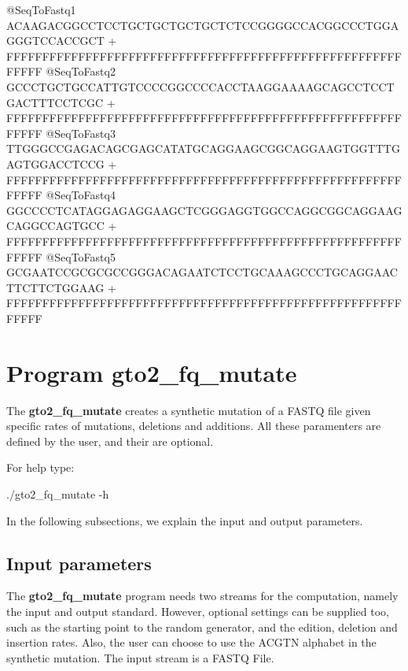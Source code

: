 \documentclass[11pt,]{krantz}
\newenvironment{Shaded}{\begin{snugshade}}{\end{snugshade}}
\newcommand{\ExtensionTok}[1]{#1}
\newcommand{\NormalTok}[1]{#1}
\begin{document}
\begin{Shaded}
\begin{Highlighting}[]
\ExtensionTok{@SeqToFastq1}
\ExtensionTok{ACAAGACGGCCTCCTGCTGCTGCTGCTCTCCGGGGCCACGGCCCTGGAGGGTCCACCGCT}
\ExtensionTok{+}
\ExtensionTok{FFFFFFFFFFFFFFFFFFFFFFFFFFFFFFFFFFFFFFFFFFFFFFFFFFFFFFFFFFFF}
\ExtensionTok{@SeqToFastq2}
\ExtensionTok{GCCCTGCTGCCATTGTCCCCGGCCCCACCTAAGGAAAAGCAGCCTCCTGACTTTCCTCGC}
\ExtensionTok{+}
\ExtensionTok{FFFFFFFFFFFFFFFFFFFFFFFFFFFFFFFFFFFFFFFFFFFFFFFFFFFFFFFFFFFF}
\ExtensionTok{@SeqToFastq3}
\ExtensionTok{TTGGGCCGAGACAGCGAGCATATGCAGGAAGCGGCAGGAAGTGGTTTGAGTGGACCTCCG}
\ExtensionTok{+}
\ExtensionTok{FFFFFFFFFFFFFFFFFFFFFFFFFFFFFFFFFFFFFFFFFFFFFFFFFFFFFFFFFFFF}
\ExtensionTok{@SeqToFastq4}
\ExtensionTok{GGCCCCTCATAGGAGAGGAAGCTCGGGAGGTGGCCAGGCGGCAGGAAGCAGGCCAGTGCC}
\ExtensionTok{+}
\ExtensionTok{FFFFFFFFFFFFFFFFFFFFFFFFFFFFFFFFFFFFFFFFFFFFFFFFFFFFFFFFFFFF}
\ExtensionTok{@SeqToFastq5}
\ExtensionTok{GCGAATCCGCGCGCCGGGACAGAATCTCCTGCAAAGCCCTGCAGGAACTTCTTCTGGAAG}
\ExtensionTok{+}
\ExtensionTok{FFFFFFFFFFFFFFFFFFFFFFFFFFFFFFFFFFFFFFFFFFFFFFFFFFFFFFFFFFFF}
\end{Highlighting}
\end{Shaded}

\section{Program gto2\_fq\_mutate}\label{program-gto2_fq_mutate}

The \textbf{gto2\_fq\_mutate} creates a synthetic mutation of a FASTQ
file given specific rates of mutations, deletions and additions. All
these paramenters are defined by the user, and their are optional.

For help type:

\begin{Shaded}
\begin{Highlighting}[]
\ExtensionTok{./gto2_fq_mutate}\NormalTok{ -h}
\end{Highlighting}
\end{Shaded}

In the following subsections, we explain the input and output
parameters.

\subsection*{Input parameters}\label{input-parameters-10}


The \textbf{gto2\_fq\_mutate} program needs two streams for the
computation, namely the input and output standard. However, optional
settings can be supplied too, such as the starting point to the random
generator, and the edition, deletion and insertion rates. Also, the user
can choose to use the ACGTN alphabet in the synthetic mutation. The
input stream is a FASTQ File.
\end{document}
